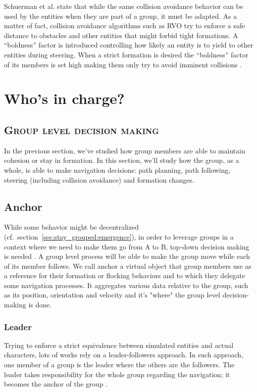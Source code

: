 \documentclass[a4paper,titlepage]{article}
\newcommand{\sectionsubtitle}[1]{{\subsection*{\scshape #1}}}
\begin{document}
Schuerman et al. state that while the same collision avoidance behavior can be used by the entities when they are part of a group, it must be adapted. As a matter of fact, collision avoidance algorithms such as RVO \cite{vandenBerg:2008tu} try to enforce a safe distance to obstacles and other entities that might forbid tight formations. A “boldness” factor is introduced controlling how likely an entity is to yield to other entities during steering. When a strict formation is desired the “boldness” factor of its members is set high making them only try to avoid imminent collisions \cite{Schuerman:2010um}.

\section{Who's in charge?}
\label{sec:who_s_in_charge}
\sectionsubtitle{Group level decision making}

In the previous section, we've studied how group members are able to maintain cohesion or stay in formation. In this section, we’ll study how the group, as a whole, is able to make navigation decisions: path planning, path following, steering (including collision avoidance) and formation changes. 

\subsection{Anchor}
\label{sec:who_s_in_charge:anchor}

While some behavior might be decentralized (cf.\ section~\ref{sec:stay_grouped:emergence}), in order to leverage groups in a context where we need to make them go from A to B, top-down decision making is needed \cite{MusTha2001}. A group level process will be able to make the group move while each of its member follows. 
We call anchor a virtual object that group members use as a reference for their formation or flocking behaviors and to which they delegate some navigation processes. It aggregates various data relative to the group, such as its position, orientation and velocity and it’s "where" the group level decision-making is done.

\subsubsection{Leader}

Trying to enforce a strict equivalence between simulated entities and actual characters, lots of works rely on a leader-followers approach. In such approach, one member of a group is the leader where the others are the followers. The leader takes responsibility for the whole group regarding the navigation; it becomes the anchor of the group \cite{Loscos:2003wh,Qiu:2010ks}.
\end{document}
